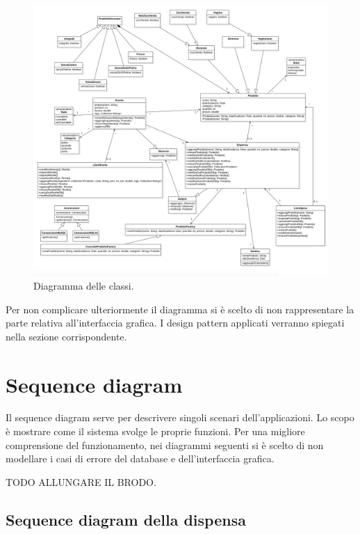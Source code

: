 \begin{figure}[H]
    \includegraphics[width=\linewidth]{images/class.jpeg}
    \caption{Diagramma delle classi.}
    \label{fig:classdiagram}
\end{figure}

Per non complicare ulteriormente il diagramma si è scelto di non rappresentare la parte relativa all'interfaccia grafica. I design pattern applicati verranno spiegati nella sezione corrispondente.

\newpage

\section{Sequence diagram}

Il sequence diagram serve per descrivere singoli scenari dell'applicazioni. Lo scopo è mostrare come il sistema svolge le proprie funzioni. Per una migliore comprensione del funzionamento, nei diagrammi seguenti si è scelto di non modellare i casi di errore del database e dell'interfaccia grafica. 

TODO ALLUNGARE IL BRODO.

\subsection{Sequence diagram della dispensa}

